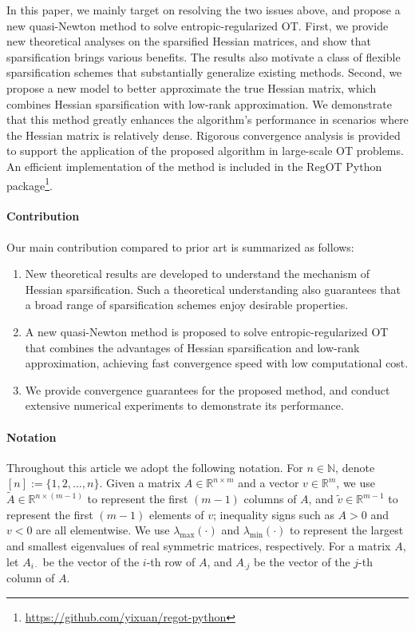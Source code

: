 \documentclass{article}
\theoremstyle{plain}
\theoremstyle{definition}
\theoremstyle{remark}
\begin{document}
In this paper, we mainly target on resolving the two issues above, and propose a new quasi-Newton method to solve entropic-regularized OT. First, we provide new theoretical analyses on the sparsified Hessian matrices, and show that sparsification brings various benefits. The results also motivate a class of flexible sparsification schemes that substantially generalize existing methods.
Second, we propose a new model to better approximate the true Hessian matrix, which combines Hessian sparsification with low-rank approximation. We demonstrate that this method greatly enhances the algorithm's performance in scenarios where the Hessian matrix is relatively dense.
Rigorous convergence analysis is provided to support the application of the proposed algorithm in large-scale OT problems.
An efficient implementation of the method is included in the RegOT Python package\footnote{\url{https://github.com/yixuan/regot-python}}.

\paragraph{Contribution}
Our main contribution compared to prior art is summarized as follows:
\begin{enumerate}
    \item New theoretical results are developed to understand the mechanism of Hessian sparsification. Such a theoretical understanding also guarantees that a broad range of sparsification schemes enjoy desirable properties.
    \item A new quasi-Newton method is proposed to solve entropic-regularized OT that combines the advantages of Hessian sparsification and low-rank approximation, achieving fast convergence speed with low computational cost.
    \item We provide convergence guarantees for the proposed method, and conduct extensive numerical experiments to demonstrate its performance.
\end{enumerate}

\paragraph{Notation}
Throughout this article we adopt the following notation. For $n \in \mathbb{N}$, denote $[n] := \{ 1, 2, \ldots, n \}$. Given a matrix $A\in\mathbb{R}^{n\times m}$ and a vector $v\in\mathbb{R}^m$, we use $\tilde{A}\in\mathbb{R}^{n\times (m-1)}$ to represent the first $(m-1)$ columns of $A$, and $\tilde{v}\in\mathbb{R}^{m-1}$ to represent the first $(m-1)$ elements of $v$; inequality signs such as $A>0$ and $v<0$ are all elementwise. We use $\lambda_{\max}(\cdot)$ and $\lambda_{\min}(\cdot)$ to represent the largest and smallest eigenvalues of real symmetric matrices, respectively. For a matrix $A$, let $A_{i \cdot}$ be the vector of the $i$-th row of $A$, and $A_{\cdot j}$ be the vector of the $j$-th column of $A$.
\end{document}
